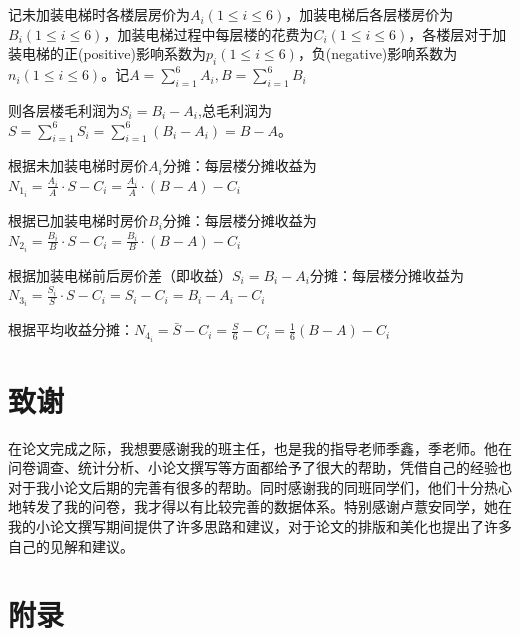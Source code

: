 \documentclass[lang=cn,a4paper]{elegantpaper}
\begin{document}
    \section{}
    \subsection{}
    记未加装电梯时各楼层房价为$A_i(1\leqslant i\leqslant 6)$，加装电梯后各层楼房价为$B_i(1\leqslant i\leqslant 6)$，加装电梯过程中每层楼的花费为$C_i(1\leqslant i\leqslant 6)$，各楼层对于加装电梯的正(positive)影响系数为$p_i(1\leqslant i\leqslant 6)$，负(negative)影响系数为$n_i(1\leqslant i\leqslant 6)$。记$\displaystyle A=\sum_{i=1}^6A_i,B=\sum_{i=1}^6B_i$

    则各层楼毛利润为$S_i=B_i-A_i$,总毛利润为$\displaystyle S=\sum_{i=1}^{6}S_i=\sum_{i=1}^{6}(B_i-A_i)=B-A$。

    根据未加装电梯时房价$A_i$分摊：每层楼分摊收益为$\displaystyle N_{1_i}=\frac{A_i}{A}\cdot S-C_i=\frac{A_i}{A}\cdot(B-A)-C_i$

    根据已加装电梯时房价$B_i$分摊：每层楼分摊收益为$\displaystyle N_{2_i}=\frac{B_i}{B}\cdot S-C_i=\frac{B_i}{B}\cdot(B-A)-C_i$

    根据加装电梯前后房价差（即收益）$S_i=B_i-A_i$分摊：每层楼分摊收益为$\displaystyle N_{3_i}=\frac{S_i}{S}\cdot S-C_i=S_i-C_i=B_i-A_i-C_i$

    根据平均收益分摊：$\displaystyle N_{4_i}=\bar{S}-C_i=\frac{S}{6}-C_i=\frac{1}{6}(B-A)-C_i$

    \section*{致谢}
    在论文完成之际，我想要感谢我的班主任，也是我的指导老师季鑫，季老师。他在问卷调查、统计分析、小论文撰写等方面都给予了很大的帮助，凭借自己的经验也对于我小论文后期的完善有很多的帮助。同时感谢我的同班同学们，他们十分热心地转发了我的问卷，我才得以有比较完善的数据体系。特别感谢卢薏安同学，她在我的小论文撰写期间提供了许多思路和建议，对于论文的排版和美化也提出了许多自己的见解和建议。
    
    \clearpage

    
    
    \clearpage
    
    \section*{附录}
    \appendix
\end{document}
